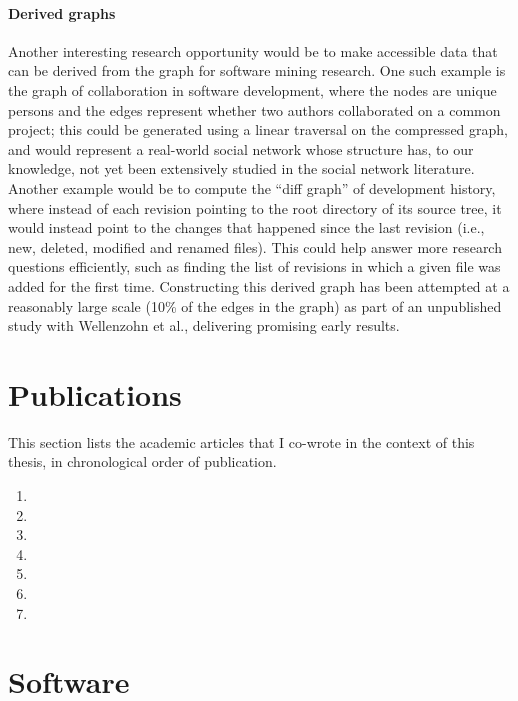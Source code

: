 \paragraph*{Derived graphs}

Another interesting research opportunity would be to make accessible data
that can be derived from the graph for software mining research. One such
example is the graph of collaboration in software development, where the nodes
are unique persons and the edges represent whether two authors collaborated on
a common project; this could be generated using a linear traversal on the
compressed graph, and would represent a real-world social network whose
structure has, to our knowledge, not yet been extensively studied in the
social network literature. Another example would be to compute the ``diff
graph'' of development history, where instead of each revision pointing to the
root directory of its source tree, it would instead point to the changes that
happened since the last revision (i.e., new, deleted, modified and renamed
files). This could help answer more research questions efficiently, such as
finding the list of revisions in which a given file was added for the first
time. Constructing this derived graph has been attempted at a reasonably
large scale (10\% of the edges in the graph) as part of an unpublished study
with Wellenzohn et al., delivering promising early results.

\section{Publications}

This section lists the academic articles that I co-wrote in the context of this
thesis, in chronological order of publication.

\begin{enumerate}
    \item {}
    \item {}
    \item {}
    \item {}
    \item {}
    \item {}
    \item {}
\end{enumerate}

\section{Software}

